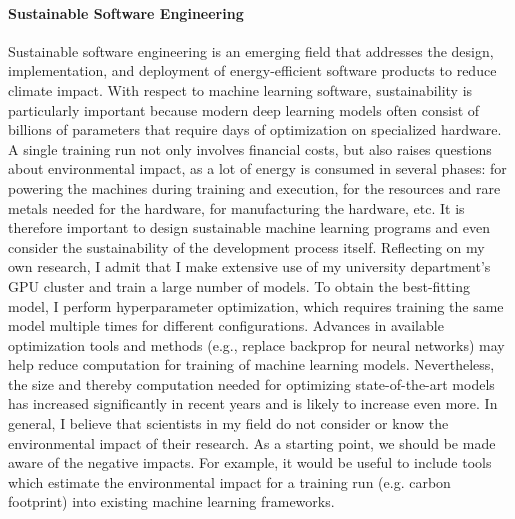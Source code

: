 \documentclass[11pt]{article}
\begin{document}
\paragraph{Sustainable Software Engineering} Sustainable software engineering is an emerging field that addresses the design, implementation, and deployment of energy-efficient software products to reduce climate impact. With respect to machine learning software, sustainability is particularly important because modern deep learning models often consist of billions of parameters that require days of optimization on specialized hardware. A single training run not only involves financial costs, but also raises questions about environmental impact, as a lot of energy is consumed in several phases: for powering the machines during training and execution, for the resources and rare metals needed for the hardware, for manufacturing the hardware, etc. It is therefore important to design sustainable machine learning programs and even consider the sustainability of the development process itself. Reflecting on my own research, I admit that I make extensive use of my university department's GPU cluster and train a large number of models. To obtain the best-fitting model, I perform hyperparameter optimization, which requires training the same model multiple times for different configurations. Advances in available optimization tools and methods (e.g., replace backprop for neural networks) may help reduce computation for training of machine learning models. Nevertheless, the size and thereby computation needed for optimizing state-of-the-art models has increased significantly in recent years and is likely to increase even more. In general, I believe that scientists in my field do not consider or know the environmental impact of their research. As a starting point, we should be made aware of the negative impacts. For example, it would be useful to include tools which estimate the environmental impact for a training run (e.g. carbon footprint) into existing machine learning frameworks.

\end{document}
